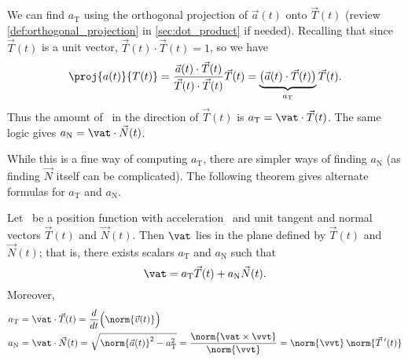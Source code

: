 We can find $a_{\mathrm{T}}$ using the orthogonal projection of $\vec a(t)$ onto $\vec T(t)$ (review \autoref{def:orthogonal_projection} in \autoref{sec:dot_product} if needed).
Recalling that since $\vec T(t)$ is a unit vector, $\vec T(t)\cdot\vec T(t)=1$, so we have 
\[\proj{a(t)}{T(t)} = \frac{\vec a(t)\cdot\vec T(t)}{\vec T(t)\cdot\vec T(t)}\vec T(t) = \underbrace{\bigl(\vec a(t)\cdot\vec T(t)\bigr)}_{a_{\mathrm{T}}}\vec T(t).\]
Thus the amount of \vat\ in the direction of $\vec T(t)$ is $a_{\mathrm{T}}=\vat\cdot\vec T(t)$. The same logic gives $a_{\mathrm{N}} = \vat\cdot\vec N(t)$.

While this is a fine way of computing $a_{\mathrm{T}}$, there are simpler ways of finding $a_{\mathrm{N}}$ (as finding $\vec N$ itself can be complicated). The following theorem gives alternate formulas for $a_{\mathrm{T}}$ and $a_{\mathrm{N}}$.


{
\begin{theorem}\label{thm:acc_plane}
Let \vrt\ be a position function with acceleration \vat\ and unit tangent and normal vectors $\vec T(t)$ and $\vec N(t)$. Then $\vat$ lies in the plane defined by $\vec T(t)$ and $\vec N(t)$; that is, there exists scalars $a_{\mathrm{T}}$ and $a_{\mathrm{N}}$ such that
\[\vat = a_{\mathrm{T}}\vec T(t) + a_{\mathrm{N}}\vec N(t).\]
Moreover,
\begin{align*}
a_\mathrm{T} &= \vat\cdot\vec T(t) = \frac{d}{dt}\Bigl(\norm{\vec v(t)}\Bigr) \\
a_\mathrm{N} &= \vat\cdot \vec N(t) = \sqrt{\norm{\vec a(t)}^2-a_\mathrm{T}^2} = \frac{\norm{\vat\times\vvt}}{\norm{\vvt}} = \norm{\vvt}\,\norm{\vec T\,'(t)}
\end{align*}%
%
%
\end{theorem}
}

